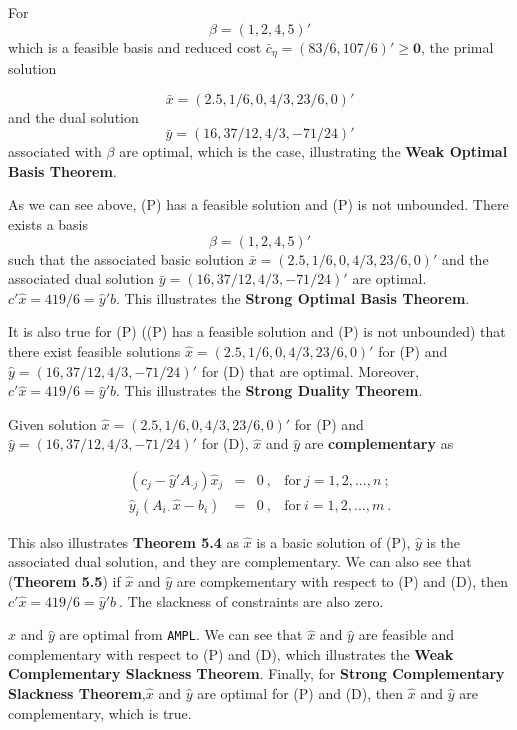 For $$\beta = (1, 2, 4, 5)'$$ which is a feasible basis and reduced cost $\bar{c}_\eta = (83/6,107/6)' \geq \mathbf{0}$, the primal solution 

$$\bar{x} = (2.5,1/6,0,4/3,23/6,0)'$$
and the dual solution $$\bar{y} = (16,37/12,4/3,-71/24)'$$ associated with $\beta$ are optimal, which is the case, illustrating the \textbf{Weak Optimal Basis Theorem}.

As we can see above, (P) has a feasible solution and (P) is not unbounded. There exists a basis $$\beta = (1, 2, 4, 5)'$$ such that the associated basic solution $\bar{x} = (2.5,1/6,0,4/3,23/6,0)'$ and the associated dual solution $\bar{y} = (16,37/12,4/3,-71/24)'$ are optimal. $c'\hat{x} = 419/6 = \hat{y}'b.$ This illustrates the \textbf{Strong Optimal Basis Theorem}.

It is also true for (P) ((P) has a feasible solution and (P) is not unbounded) that there exist feasible solutions $\hat{x}=(2.5,1/6,0,4/3,23/6,0)'$ for (P) and $\hat{y}=(16,37/12,4/3,-71/24)'$ for (D) that are optimal. Moreover,  $c'\hat{x} = 419/6 = \hat{y}'b.$ This illustrates the \textbf{Strong Duality Theorem}.

Given solution  $\hat{x}=(2.5,1/6,0,4/3,23/6,0)'$ for (P) and $\hat{y}=(16,37/12,4/3,-71/24)'$ for (D), $\hat{x}$ and $\hat{y}$ are \textbf{complementary} as

\[
\begin{array}{rccl}
 (c_j-\hat{y}'A_{\cdot j})\hat{x}_j &  = & 0~,& \text{for}~j=1,2,...,n ~; \\
 \hat{y}_i(A_{i\cdot}\hat{x}-b_i) & = & 0~, & \text{for}~i=1,2,...,m ~.
\end{array}
\]

This also illustrates \textbf{Theorem 5.4} as $\hat{x}$ is a basic solution of (P), $\hat{y}$ is the associated dual solution, and they are complementary. We can also see that (\textbf{Theorem 5.5}) if $\hat{x}$ and $\hat{y}$ are compkementary with respect to (P) and (D), then $c'\hat{x} = 419/6 = \hat{y}'b~.$ The slackness of constraints are also zero.

$\hat{x}$ and $\hat{y}$ are optimal from {\tt AMPL}. We can see that $\hat{x}$ and $\hat{y}$ are feasible and complementary with respect to (P) and (D), which illustrates the \textbf{Weak Complementary Slackness Theorem}. Finally, for \textbf{Strong Complementary Slackness Theorem},$\hat{x}$ and $\hat{y}$ are optimal for (P) and (D), then $\hat{x}$ and $\hat{y}$ are complementary, which is true.
